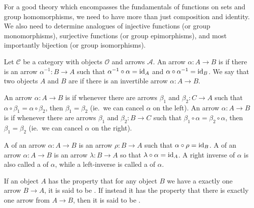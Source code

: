 For a good theory which encompasses the fundamentals of functions on
sets and group homomorphisms, we need to have more than just
composition and identity.  We also need to determine analogues of
injective functions (or group monomorphisms), surjective functions (or
group epimorphisms), and most importantly bijection (or group
isomorphisms).

\begin{definition}
  Let $\mathcal{C}$ be a category with objects $\mathcal{O}$ and
  arrows $\mathcal{A}$.  An arrow $\alpha: A \to B$ is
   if there is an arrow
  $\alpha^{-1}: B \to A$ such that $\alpha^{-1} \circ \alpha =
  \text{id}_{A}$ and $\alpha \circ \alpha^{-1} = \text{id}_{B}$.  We say that two
  objects $A$ and $B$ are  if there is an
  invertible arrow $\alpha: A \to B$.
  
  An arrow $\alpha: A \to B$ is  if whenever
  there are arrows $\beta_{1}$ and $\beta_{2}: C \to A$ such that
  $\alpha \circ \beta_{1} = \alpha \circ \beta_{2}$, then $\beta_{1} =
  \beta_{2}$ (ie.~we can cancel $\alpha$ on the left).  An arrow
  $\alpha: A \to B$ is  if whenever there are
  arrows $\beta_{1}$ and $\beta_{2}: B \to C$ such that $\beta_{1}
  \circ \alpha = \beta_{2} \circ \alpha$, then $\beta_{1} = \beta_{2}$
  (ie.~we can cancel $\alpha$ on the right).
  
  A  of an arrow $\alpha: A
  \to B$ is an arrow $\rho: B \to A$ such that $\alpha \circ \rho =
  \text{id}_{B}$.  A  of an arrow
  $\alpha: A \to B$ is an arrow $\lambda: B \to A$ so that $\lambda
  \circ \alpha = \text{id}_{A}$.  A right inverse of $\alpha$ is also called 
  a  of $\alpha$, while a left-inverse is 
  called a  of $\alpha$.
  
  If an object $A$ has the property that for any object $B$ we have a
  exactly one arrow $B \to A$, it is said to be
  .  If instead it has the property
  that there is exactly one arrow from $A \to B$, then it is said to
  be .
\end{definition}


